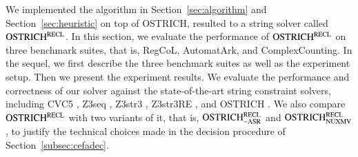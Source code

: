 
We implemented the algorithm in Section~\ref{sec:algorithm} and Section~\ref{sec:heuristic} on top of OSTRICH, resulted to a string solver called $\rm OSTRICH^{RECL}$. 
%
In this section, we evaluate the performance of $\rm OSTRICH^{RECL}$ on three benchmark suites, that is, RegCoL, AutomatArk, and ComplexCounting. In the sequel, we first describe the three benchmark suites as well as the experiment setup. Then we present the experiment results. We evaluate the performance and correctness of our solver against the state-of-the-art string constraint solvers, including CVC5 \cite{cvc5}, Z3seq \cite{z3seq}, Z3str3 \cite{Z3-str3}, Z3str3RE \cite{BD+23}, and OSTRICH \cite{CHL+19}. We also compare $\rm OSTRICH^{RECL}$ with two variants of it, that is, $\rm OSTRICH^{RECL}_{\rm -ASR}$ and $\rm OSTRICH^{RECL}_{\rm NUXMV}$, to justify the technical choices made in the decision procedure of Section~\ref{subsec:cefadec}.

 




